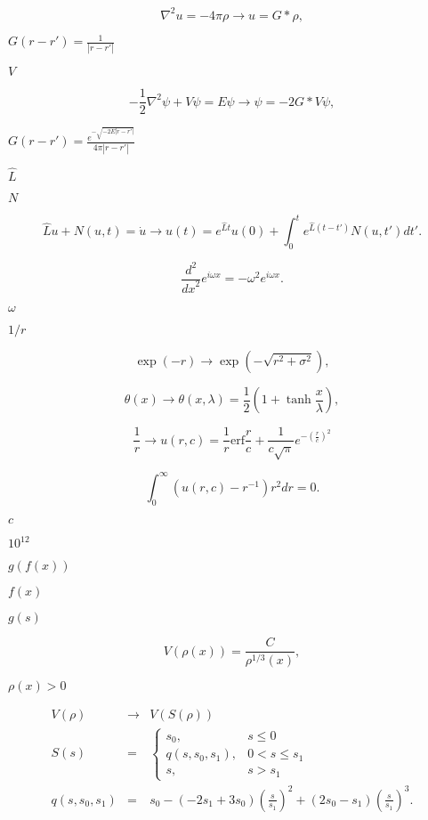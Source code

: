 \documentclass{article}
\begin{document}
\[
\nabla^{2} u = -4\pi\rho \to u=G \ast \rho,
\]
\pagebreak

$G(r-r')=\frac{1}{|r-r'|}$
\pagebreak

$V$
\pagebreak

\[
- \frac{1}{2} \nabla^{2} \psi + V\psi = E \psi \to \psi = -2G \ast V\psi,
\]
\pagebreak

$G(r-r')=\frac{e^{-\sqrt{-2E|r-r'|}}}{4\pi |r-r'|} $
\pagebreak

$\hat{L}$
\pagebreak

$N$
\pagebreak

\[
\hat{L}u + N(u,t) = \dot{u} \to u(t) = e^{\hat{L} t} u(0) + \int _{0}^{t} e^{\hat{L} (t-t')} N(u,t') \mathit{d}t'.
\]
\pagebreak

\[
\frac{d^{2}}{\mathit{dx}^{2}}e^{i\omega x}=-\omega ^{2}e^{i\omega x}.
\]
\pagebreak

$\omega$
\pagebreak

$1/r$
\pagebreak

\[
\exp(-r) \to \exp (-\sqrt{r^{2}+\sigma ^{2}}),
\]
\pagebreak

\[
\theta(x) \to \theta(x, \lambda) = \frac{1}{2} (1 + \tanh\frac{x}{\lambda}),
\]
\pagebreak

\[
\frac{1}{r} \to u(r,c) = \frac{1}{r} \mathrm{erf} \frac{r}{c} + \frac{1}{c\sqrt{\pi}} e^{-\left( \frac{r}{c} \right)^{2}}
\]
\pagebreak

\[
\int_{0}^{\infty} \left(u(r, c) - r^{-1}\right) r^{2} d\mathit{r} = 0.
\]
\pagebreak

$c$
\pagebreak

$10^{12}$
\pagebreak

$g(f(x))$
\pagebreak

$f(x)$
\pagebreak

$g(s)$
\pagebreak

\[
V(\rho(x)) = \frac{C}{\rho^{1/3}(x)},
\]
\pagebreak

$\rho (x)>0$
\pagebreak

\begin{eqnarray*}
V(\rho) & \to & V(S(\rho)) \\
S(s) & = & \left\{ \begin{array}{ll} s_{0}, & s\le 0 \\ q(s, s_{0}, s_{1}), & 0 < s \le s_{1} \\ s, & s > s_{1} \end{array} \right. \\
q(s, s_{0}, s_{1}) & = & s_{0} - (-2s_{1} + 3s_{0}) \left( \frac{s}{s_{1}} \right)^{2} + (2s_{0} - s_{1}) \left(\frac{s}{s_{1}}\right)^{3}.
\end{eqnarray*}
\pagebreak
\end{document}
